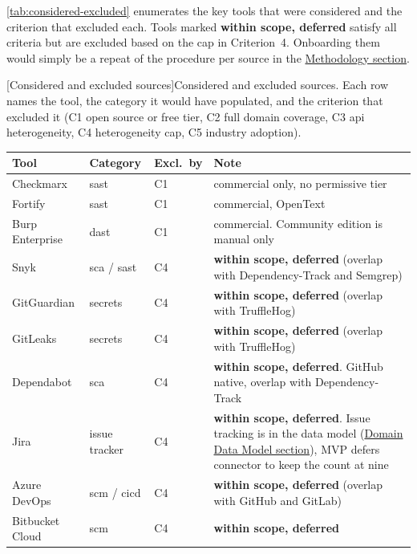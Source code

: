 \autoref{tab:considered-excluded} enumerates the key tools that were considered and the criterion that excluded each. Tools marked \textbf{within scope, deferred} satisfy all criteria but are excluded based on the cap in Criterion~4. Onboarding them would simply be a repeat of the procedure per source in the \hyperref[sec:impl-methodology]{Methodology section}.

\begin{center}
\begin{minipage}{\textwidth}
[Considered and excluded sources]{Considered and excluded sources. Each row names the tool, the category it would have populated, and the criterion that excluded it (C1 open source or free tier, C2 full domain coverage, C3 \gls{api} heterogeneity, C4 heterogeneity cap, C5 industry adoption).}
\label{tab:considered-excluded}
\small
\begin{tabularx}{\linewidth}{l l l X}
\toprule
\textbf{Tool} & \textbf{Category} & \textbf{Excl.\ by} & \textbf{Note} \\
\midrule
Checkmarx         & \gls{sast}          & C1     & commercial only, no permissive tier \\
Fortify           & \gls{sast}          & C1     & commercial, OpenText \\
Burp Enterprise   & \gls{dast}          & C1     & commercial. Community edition is manual only \\
Snyk              & \gls{sca} / \gls{sast} & C4  & \textbf{within scope, deferred} (overlap with Dependency-Track and Semgrep) \\
GitGuardian       & secrets       & C4     & \textbf{within scope, deferred} (overlap with TruffleHog) \\
GitLeaks          & secrets       & C4     & \textbf{within scope, deferred} (overlap with TruffleHog) \\
Dependabot        & \gls{sca}           & C4     & \textbf{within scope, deferred}. GitHub native, overlap with Dependency-Track \\
Jira              & issue tracker & C4     & \textbf{within scope, deferred}. Issue tracking is in the data model (\hyperref[sec:data-entities]{Domain Data Model section}), MVP defers connector to keep the count at nine \\
Azure DevOps      & \gls{scm} / \gls{cicd} & C4 & \textbf{within scope, deferred} (overlap with GitHub and GitLab) \\
Bitbucket Cloud   & \gls{scm}           & C4     & \textbf{within scope, deferred} \\

\end{tabularx}
\end{minipage}
\end{center}
